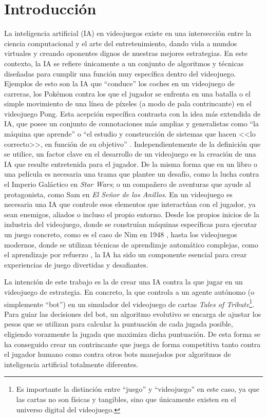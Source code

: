 \chapter{Introducción} \label{chap:introduccion}

La inteligencia artificial (IA) en videojuegos existe en una intersección entre la ciencia computacional y el arte del entretenimiento, dando vida a mundos virtuales y creando oponentes dignos de nuestras mejores estrategias. En este contexto, la IA se refiere únicamente a un conjunto de algoritmos y técnicas diseñadas para cumplir una función muy específica dentro del videojuego. Ejemplos de esto son la IA que ``conduce'' los coches en un videojuego de carreras, los Pokémon contra los que el jugador se enfrenta en una batalla o el simple movimiento de una línea de píxeles (a modo de pala contrincante) en el videojuego Pong. Esta acepción específica contrasta con la idea más extendida de IA, que posee un conjunto de connotaciones más amplias y generalistas como ``la máquina que aprende'' o ``el estudio y construcción de sistemas que hacen <<lo correcto>>, en función de su objetivo'' \cite{russell_artificial_2020}. Independientemente de la definición que se utilice, un factor clave en el desarrollo de un videojuego es la creación de una IA que resulte entretenida para el jugador. De la misma forma que en un libro o una película es necesaria una trama que plantee un desafío, como la lucha contra el Imperio Galáctico en \textit{Star Wars}; o un compañero de aventuras que ayude al protagonista, como Sam en \textit{El Señor de los Anillos}. En un videojuego es necesaria una IA que controle esos elementos que interactúan con el jugador, ya sean enemigos, aliados o incluso el propio entorno. Desde los propios inicios de la industria del videojuego, donde se construían máquinas específicas para ejecutar un juego concreto, como es el caso de Nim en 1948 \cite{redheffer_machine_1948}, hasta los videojuegos modernos, donde se utilizan técnicas de aprendizaje automático complejas, como el aprendizaje por refuerzo \cite{gaudreau_game_2025}, la IA ha sido un componente esencial para crear experiencias de juego divertidas y desafiantes.

La intención de este trabajo es la de crear una IA contra la que jugar en un videojuego de estrategia. En concreto, la que controla a un agente autónomo (o simplemente ``bot'') en un simulador del videojuego de cartas \textit{Tales of Tribute}\footnote{Es importante la distinción entre ``juego'' y ``videojuego'' en este caso, ya que las cartas no son físicas y tangibles, sino que únicamente existen en el universo digital del videojuego.}. Para guiar las decisiones del bot, un algoritmo evolutivo se encarga de ajustar los pesos que se utilizan para calcular la puntuación de cada jugada posible, eligiendo vorazmente la jugada que maximiza dicha puntuación. De esta forma se ha conseguido crear un contrincante que juega de forma competitiva tanto contra el jugador humano como contra otros bots manejados por algoritmos de inteligencia artificial totalmente diferentes.